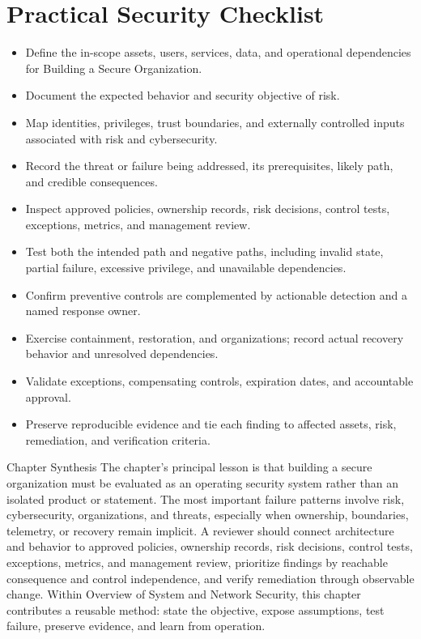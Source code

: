 \documentclass[11pt,letterpaper]{article}
\begin{document}
\section*{Practical Security Checklist}
\begin{itemize}[label=$\square$]
\item Define the in-scope assets, users, services, data, and operational dependencies for Building a Secure Organization.
\item Document the expected behavior and security objective of risk.
\item Map identities, privileges, trust boundaries, and externally controlled inputs associated with risk and cybersecurity.
\item Record the threat or failure being addressed, its prerequisites, likely path, and credible consequences.
\item Inspect approved policies, ownership records, risk decisions, control tests, exceptions, metrics, and management review.
\item Test both the intended path and negative paths, including invalid state, partial failure, excessive privilege, and unavailable dependencies.
\item Confirm preventive controls are complemented by actionable detection and a named response owner.
\item Exercise containment, restoration, and organizations; record actual recovery behavior and unresolved dependencies.
\item Validate exceptions, compensating controls, expiration dates, and accountable approval.
\item Preserve reproducible evidence and tie each finding to affected assets, risk, remediation, and verification criteria.
\end{itemize}
\begin{CornellSummaryBox}{Chapter Synthesis}
The chapter's principal lesson is that building a secure organization must be evaluated as an operating security system rather than an isolated product or statement. The most important failure patterns involve risk, cybersecurity, organizations, and threats, especially when ownership, boundaries, telemetry, or recovery remain implicit. A reviewer should connect architecture and behavior to approved policies, ownership records, risk decisions, control tests, exceptions, metrics, and management review, prioritize findings by reachable consequence and control independence, and verify remediation through observable change. Within Overview of System and Network Security, this chapter contributes a reusable method: state the objective, expose assumptions, test failure, preserve evidence, and learn from operation.
\end{CornellSummaryBox}
\end{document}
